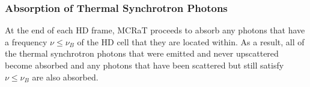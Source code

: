 \documentclass[12pt,a4paper]{article}
\begin{document}
\subsubsection{Absorption of Thermal Synchrotron Photons}
At the end of each HD frame, MCRaT proceeds to absorb any photons that have a frequency  $\nu \le \nu_B$ of the HD cell that they are located within. As a result, all of the thermal synchrotron photons that were emitted and never upscattered become absorbed and any photons that have been scattered but still satisfy  $\nu \le \nu_B$ are also absorbed.



\end{document}
